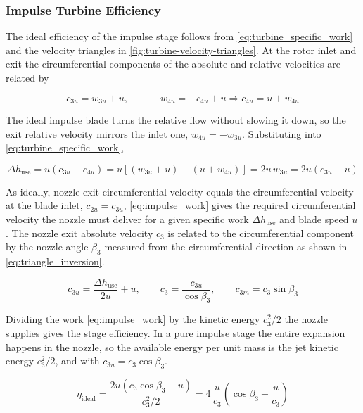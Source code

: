 \subsubsection{Impulse Turbine Efficiency}

The ideal efficiency of the impulse stage follows from \cref{eq:turbine_specific_work} and the velocity triangles in \cref{fig:turbine-velocity-triangles}. At the rotor inlet and exit the circumferential components of the absolute and relative velocities are related by

\begin{equation}
    c_{3u} = w_{3u} + u, \qquad -w_{4u} = -c_{4u} + u \Rightarrow c_{4u} = u + w_{4u}
    \label{eq:triangle_components}
\end{equation}

The ideal impulse blade turns the relative flow without slowing it down, so the exit relative velocity mirrors the inlet one, $w_{4u} = -w_{3u}$. Substituting into \cref{eq:turbine_specific_work},

\begin{equation}
    \Delta h_{\textrm{use}} = u\left(c_{3u} - c_{4u}\right)
    = u\left[(w_{3u}+u) - (u+w_{4u})\right]
    = 2u\, w_{3u}
    = 2u\left(c_{3u} - u\right)
    \label{eq:impulse_work}
\end{equation}

As ideally, nozzle exit circumferential velocity equals the circumferential velocity at the blade inlet, $c_{2u}=c_{3u}$, \cref{eq:impulse_work} gives the required circumferential velocity the nozzle must deliver for a given specific work $\Delta h_{\textrm{use}}$ and blade speed $u$. The nozzle exit absolute velocity $c_3$ is related to the circumferential component by the nozzle angle $\beta_3$ measured from the circumferential direction as shown in \cref{eq:triangle_inversion}.

\begin{equation}
    c_{3u} = \frac{\Delta h_{\textrm{use}}}{2u} + u, \qquad
    c_3 = \frac{c_{3u}}{\cos\beta_3}, \qquad
    c_{3m} = c_3 \sin\beta_3
    \label{eq:triangle_inversion}
\end{equation}

Dividing the work \cref{eq:impulse_work} by the kinetic energy $c_3^2/2$ the nozzle supplies gives the stage efficiency. In a pure impulse stage the entire expansion happens in the nozzle, so the available energy per unit mass is the jet kinetic energy $c_3^2/2$, and with $c_{3u} = c_3\cos\beta_3$.

\begin{equation}
    \eta_{\textrm{ideal}}
    = \frac{2u\left(c_3\cos\beta_3 - u\right)}{c_3^2/2}
    = 4\,\frac{u}{c_3}\left(\cos\beta_3 - \frac{u}{c_3}\right)
    \label{eq:impulse_ideal_efficiency}
\end{equation}

